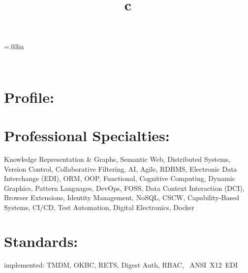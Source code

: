 \documentclass[line,margin,hidelinks]{res}
\begin{document}
\def\resOrCvLink{
  \href{\cvUrl}{full CV}}



\begin{resume}

\sectionskip=.03in

\begin{format}
\title{c}\\
\end{format}


\section{Profile:
  \newline \newline
  \maybemugshot
}



\section{Professional Specialties:}
\begin{par}
\small{Knowledge Representation \& Graphs,
Semantic Web,
Distributed Systems,
Version Control,
Collaborative Filtering,
AI,
Agile,
RDBMS,
Electronic Data Interchange (EDI),
ORM,
OOP,
Functional,
Cognitive Computing,
Dynamic Graphics,
Pattern Languages,
DevOps,
FOSS,
Data Context Interaction (DCI),
Browser Extensions,
Identity Management,
NoSQL,
CSCW,
Capability-Based Systems,
CI/CD,
Test Automation,
Digital Electronics,
Docker}
\end{par}

\section{Standards:}
\begin{par}
implemented:
TMDM,
OKBC,
RETS,
Digest Auth,
RBAC,
~ANSI~X12~EDI
\end{par}


\end{resume}
\end{document}
